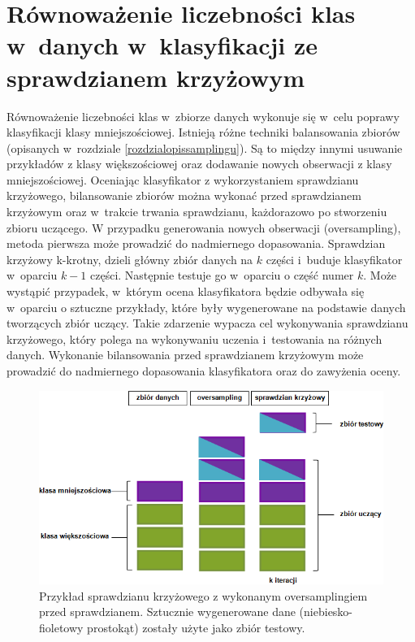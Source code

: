 \section{Równoważenie liczebności klas w~danych w~klasyfikacji ze sprawdzianem krzyżowym}
\label{rozdzialbalansowanie}
Równoważenie liczebności klas w~zbiorze danych wykonuje się w~celu poprawy klasyfikacji klasy mniejszościowej. Istnieją różne techniki balansowania zbiorów (opisanych w~rozdziale \ref{rozdzialopissamplingu}). Są to między innymi usuwanie przykładów z klasy większościowej oraz dodawanie nowych obserwacji z klasy mniejszościowej. Oceniając klasyfikator z wykorzystaniem sprawdzianu krzyżowego, bilansowanie zbiorów można wykonać przed sprawdzianem krzyżowym oraz w~trakcie trwania sprawdzianu, każdorazowo po stworzeniu zbioru uczącego. W przypadku generowania nowych obserwacji (oversampling), metoda pierwsza może prowadzić do nadmiernego dopasowania. Sprawdzian krzyżowy k-krotny, dzieli główny zbiór danych na $k$ części i~buduje klasyfikator w~oparciu $k-1$ części. Następnie testuje go w~oparciu o część numer $k$. Może wystąpić przypadek, w~którym ocena klasyfikatora będzie odbywała się w~oparciu o sztuczne przykłady, które były wygenerowane na podstawie danych tworzących zbiór uczący. Takie zdarzenie wypacza cel wykonywania sprawdzianu krzyżowego, który polega na wykonywaniu uczenia i~testowania na różnych danych. Wykonanie bilansowania przed sprawdzianem krzyżowym może prowadzić do nadmiernego dopasowania klasyfikatora oraz do zawyżenia oceny. 
\begin{figure}[H]
	\centering
	\includegraphics[width=\textwidth]{./images/oversampling.png}
	\caption[Sprawdzian krzyżowy z oversamplingiem]{Przykład sprawdzianu krzyżowego z wykonanym oversamplingiem przed sprawdzianem. Sztucznie wygenerowane dane (niebiesko-fioletowy prostokąt) zostały użyte jako zbiór testowy.}
	\label{fig:oversampling_wrong}
\end{figure}
